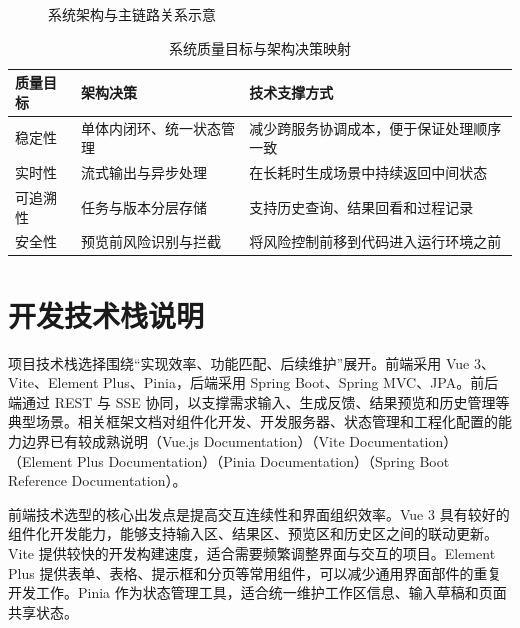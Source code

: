 \begin{figure}[htbp]
\centering
{}
\caption{系统架构与主链路关系示意}
\label{fig:chapter2-arch-flow}
\end{figure}

\begin{table}[htbp]
\centering
\caption{系统质量目标与架构决策映射}
\label{tab:chapter2-quality-mapping}
\small
\begin{tabular}{@{}p{}p{}p{}@{}}
\toprule
质量目标 & 架构决策 & 技术支撑方式 \\
\midrule
稳定性 & 单体内闭环、统一状态管理 & 减少跨服务协调成本，便于保证处理顺序一致 \\
实时性 & 流式输出与异步处理 & 在长耗时生成场景中持续返回中间状态 \\
可追溯性 & 任务与版本分层存储 & 支持历史查询、结果回看和过程记录 \\
安全性 & 预览前风险识别与拦截 & 将风险控制前移到代码进入运行环境之前 \\
\bottomrule
\end{tabular}
\end{table}

\section{开发技术栈说明}
项目技术栈选择围绕“实现效率、功能匹配、后续维护”展开。前端采用 Vue 3、Vite、Element Plus、Pinia，后端采用 Spring Boot、Spring MVC、JPA。前后端通过 REST 与 SSE 协同，以支撑需求输入、生成反馈、结果预览和历史管理等典型场景。相关框架文档对组件化开发、开发服务器、状态管理和工程化配置的能力边界已有较成熟说明（Vue.js Documentation）（Vite Documentation）（Element Plus Documentation）（Pinia Documentation）（Spring Boot Reference Documentation）\cite{vuedocs2025}\cite{vitedocs2025}\cite{elementplusdocs2025}\cite{piniadocs2025}\cite{springbootdocs2025}。

前端技术选型的核心出发点是提高交互连续性和界面组织效率。Vue 3 具有较好的组件化开发能力，能够支持输入区、结果区、预览区和历史区之间的联动更新。Vite 提供较快的开发构建速度，适合需要频繁调整界面与交互的项目。Element Plus 提供表单、表格、提示框和分页等常用组件，可以减少通用界面部件的重复开发工作。Pinia 作为状态管理工具，适合统一维护工作区信息、输入草稿和页面共享状态。

